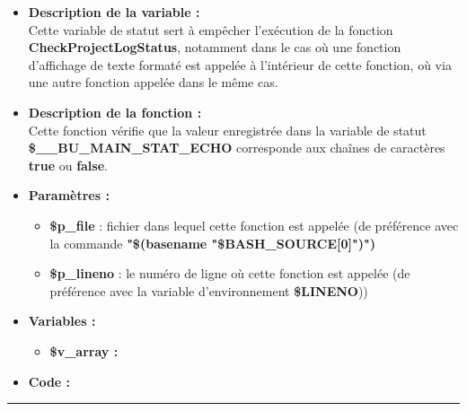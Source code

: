 \documentclass[a4paper,10pt]{article}
\begin{document}
\begin{itemize}
    \item \textbf{Description de la variable :}\\
    Cette variable de statut sert à empêcher l'exécution de la fonction \textbf{\color{mauve}CheckProjectLogStatus}, notamment dans le cas où une fonction d'affichage de texte formaté est appelée à l'intérieur de cette fonction, où via une autre fonction appelée dans le même cas.\\[1\baselineskip]

    \item \textbf{Description de la fonction :}\\
        Cette fonction vérifie que la valeur enregistrée dans la variable de statut \textbf{\color{orange}\$\_\_BU\_MAIN\_STAT\_ECHO} corresponde aux chaînes de caractères \textbf{true} ou \textbf{false}.\\[1\baselineskip]

    \item \textbf{Paramètres :}
    \begin{itemize}
        \item \color{orange}\textbf{\$p\_file}\color{white} : fichier dans lequel cette fonction est appelée (de préférence avec la commande \textbf{"\$(\color{gray}basename \color{white}"\color{orange}\$BASH\_SOURCE[0]\color{white}")")}\\[1\baselineskip]

        \item \color{orange}\textbf{\$p\_lineno}\color{white} : le numéro de ligne où cette fonction est appelée (de préférence avec la variable d'environnement \textbf{\color{orange}\$LINENO}))\\[1\baselineskip]
    \end{itemize}

    \item \textbf{Variables :}
    \begin{itemize}
        \item \textbf{\color{orange}\$v\_array\color{white} :}\\[1\baselineskip]
    \end{itemize}


    \item \textbf{Code :}
\end{itemize}


\color{blue}\par\noindent\rule{\textwidth}{0.4pt}\color{white}

\color{blue}
\end{document}
